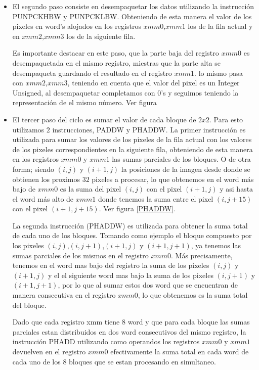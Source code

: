 \begin{itemize}
	\item El segundo paso consiste en desempaquetar los datos utilizando la instrucción PUNPCKHBW y PUNPCKLBW. Obteniendo de esta manera el valor de los pixeles en word's alojados en los registros $xmm0$,$xmm1$ los de la fila actual y en $xmm2$,$xmm3$ los de la siguiente fila.

	Es importante destacar en este paso, que la parte baja del registro $xmm0$ es desempaquetada en el mismo registro, miestras que la parte alta se desempaqueta guardando el resultado en el registro $xmm1$. lo mismo pasa con $xmm2$,$xmm3$, teniendo en cuenta que el valor del pixel es un Integer Unsigned, al desempaquetar completamos con $0$'s y seguimos teniendo la representación de el mismo número. Ver figura %


	\item El tercer paso del ciclo es sumar el valor de cada bloque de $2x2$. Para esto utilizamos $2$ instrucciones, PADDW y PHADDW. La primer instrucción es utilizada para sumar los valores de los pixeles de la fila actual con los valores de los pixeles correspondientes en la siguiente fila, obteniendo de esta manera en los registros $xmm0$ y $xmm1$ las sumas parciales de los bloques. O de otra forma; siendo $(i,j)$ y $(i+1,j)$ la posiciones de la imagen desde donde se obtienen los proximos $32$ pixeles a procesar, lo que obtenemos en el word más bajo de $xmm0$ es la suma del pixel $(i,j)$ con el pixel $(i+1,j)$ y asi hasta el word más alto de $xmm1$ donde tenemos la suma entre el pixel $(i,j+15)$ con el pixel $(i+1,j+15)$. Ver figura \ref{PHADDW}.

	La segunda instrucción (PHADDW) es utilizada para obtener la suma total de cada uno de los bloques. Tomando como ejemplo el bloque compuesto por los pixeles $(i,j)$,$(i,j+1)$,$(i+1,j)$ y $(i+1,j+1)$, ya tenemos las sumas parciales de los mismos en el registro $xmm0$. Más precisamente, tenemos en el word mas bajo del registro la suma de los pixeles $(i,j)$ y $(i+1,j)$ y el el siguiente word mas bajo la suma de los pixeles $(i,j+1)$ y $(i+1,j+1)$, por lo que al sumar estos dos word que se encuentran de manera consecutiva en el registro $xmm0$, lo que obtenemos es la suma total del bloque. 

	Dado que cada registro xmm tiene $8$ word y que para cada bloque las sumas parciales estan distribuidos en dos word consecutivos del mismo registro, la instrucción PHADD utilizando como operandos los registros $xmm0$ y $xmm1$ devuelven en el registro $xmm0$ efectivamente la suma total en cada word de cada uno de los $8$ bloques que se estan procesando en simultaneo.


\end{itemize}
